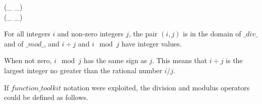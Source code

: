 \documentclass[draft,a4paper,10pt,wd]{isov2}
\begin{document}

\begin{zed}
 \leftassoc (\_ \div \_)\\
 \leftassoc (\_ \mod \_)
\end{zed}


For all integers $i$ and non-zero integers $j$,
the pair $(i, j)$ is in the domain of $\_ div \_$ and of $\_ mod \_$,
and $i \div j$ and $i \mod j$ have integer values.

When not zero, $i \mod j$ has the same sign as $j$.
This means that $i \div j$ is the largest integer no greater
than the rational number $i/j$.
\begin{note}
If $function\_toolkit$ notation were exploited,
the division and modulus operators could be defined as follows.
\end{note}
\end{document}
